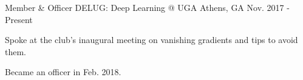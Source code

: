 \begin{cventries}

\cventry
{Member \& Officer}
{DELUG: Deep Learning @ UGA}
{Athens, GA}
{Nov. 2017 - Present}
{\begin{cvitems}
    \item {Spoke at the club's inaugural meeting on vanishing gradients and tips to avoid them.}
    \item {Became an officer in Feb. 2018.}
\end{cvitems}}

\end{cventries}
